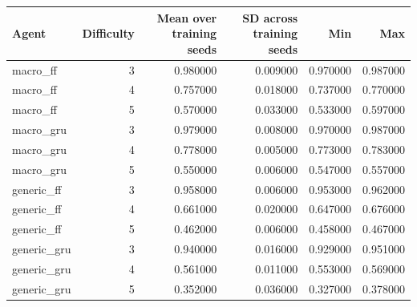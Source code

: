 \begin{tabular}{lrrrrr}
\toprule
Agent & Difficulty & Mean over training seeds & SD across training seeds & Min & Max \\
\midrule
macro\_ff & 3 & 0.980000 & 0.009000 & 0.970000 & 0.987000 \\
macro\_ff & 4 & 0.757000 & 0.018000 & 0.737000 & 0.770000 \\
macro\_ff & 5 & 0.570000 & 0.033000 & 0.533000 & 0.597000 \\
macro\_gru & 3 & 0.979000 & 0.008000 & 0.970000 & 0.987000 \\
macro\_gru & 4 & 0.778000 & 0.005000 & 0.773000 & 0.783000 \\
macro\_gru & 5 & 0.550000 & 0.006000 & 0.547000 & 0.557000 \\
generic\_ff & 3 & 0.958000 & 0.006000 & 0.953000 & 0.962000 \\
generic\_ff & 4 & 0.661000 & 0.020000 & 0.647000 & 0.676000 \\
generic\_ff & 5 & 0.462000 & 0.006000 & 0.458000 & 0.467000 \\
generic\_gru & 3 & 0.940000 & 0.016000 & 0.929000 & 0.951000 \\
generic\_gru & 4 & 0.561000 & 0.011000 & 0.553000 & 0.569000 \\
generic\_gru & 5 & 0.352000 & 0.036000 & 0.327000 & 0.378000 \\
\bottomrule
\end{tabular}
